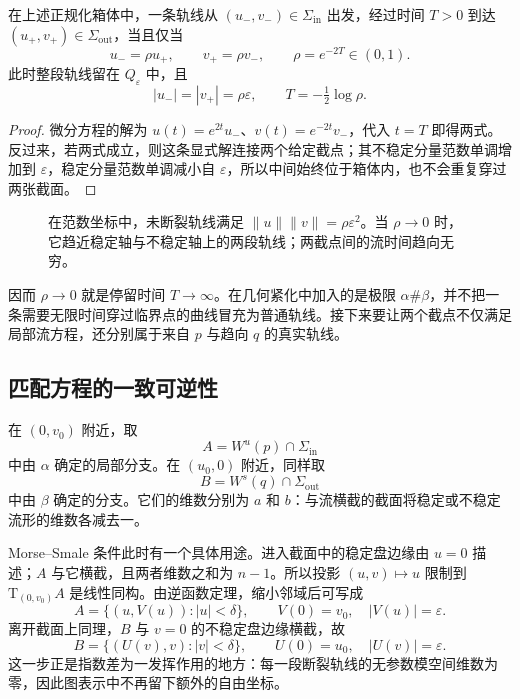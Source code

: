 \begin{lemma}\label{g2:lem:local-passage-equations}
	在上述正规化箱体中，一条轨线从 \((u_-,v_-)\in\Sigma_{\mathrm{in}}\) 出发，经过时间 \(T>0\) 到达 \((u_+,v_+)\in\Sigma_{\mathrm{out}}\)，当且仅当
	\begin{equation}\label{g2:eq:local-passage-matching}
		u_-=\rho u_+,\qquad v_+=\rho v_-,
		\qquad \rho=e^{-2T}\in(0,1).
	\end{equation}
	此时整段轨线留在 \(Q_\varepsilon\) 中，且
	\[
		|u_-|=|v_+|=\rho\varepsilon,\qquad
		T=-\tfrac12\log\rho.
	\]
\end{lemma}
\begin{proof}
	微分方程的解为 \(u(t)=e^{2t}u_-\)、\(v(t)=e^{-2t}v_-\)，代入 \(t=T\) 即得两式。反过来，若两式成立，则这条显式解连接两个给定截点；其不稳定分量范数单调增加到 \(\varepsilon\)，稳定分量范数单调减小自 \(\varepsilon\)，所以中间始终位于箱体内，也不会重复穿过两张截面。
\end{proof}

\begin{figure}[htbp]
	\centering
	
	\caption[正规化流的局部粘合]{在范数坐标中，未断裂轨线满足 \(\lVert u\rVert\lVert v\rVert=\rho\varepsilon^2\)。当 \(\rho\to0\) 时，它趋近稳定轴与不稳定轴上的两段轨线；两截点间的流时间趋向无穷。}
	\label{g2:fig:local-trajectory-gluing}
\end{figure}

因而 \(\rho\to0\) 就是停留时间 \(T\to\infty\)。在几何紧化中加入的是极限 \(\alpha\#\beta\)，并不把一条需要无限时间穿过临界点的曲线冒充为普通轨线。接下来要让两个截点不仅满足局部流方程，还分别属于来自 \(p\) 与趋向 \(q\) 的真实轨线。

\subsection{匹配方程的一致可逆性}
\label{g2:subsec:1803:02}

在 \((0,v_0)\) 附近，取
\[
	A=W^u(p)\cap\Sigma_{\mathrm{in}}
\]
中由 \(\alpha\) 确定的局部分支。在 \((u_0,0)\) 附近，同样取
\[
	B=W^s(q)\cap\Sigma_{\mathrm{out}}
\]
中由 \(\beta\) 确定的分支。它们的维数分别为 \(a\) 和 \(b\)：与流横截的截面将稳定或不稳定流形的维数各减去一。

\ProseParagraphBreak

Morse--Smale 条件此时有一个具体用途。进入截面中的稳定盘边缘由 \(u=0\) 描述；\(A\) 与它横截，且两者维数之和为 \(n-1\)。所以投影 \((u,v)\mapsto u\) 限制到 \(\mathrm T_{(0,v_0)}A\) 是线性同构。由逆函数定理，缩小邻域后可写成
\[
	A=\{(u,V(u)):|u|<\delta\},\qquad
	V(0)=v_0,\quad |V(u)|=\varepsilon.
\]
离开截面上同理，\(B\) 与 \(v=0\) 的不稳定盘边缘横截，故
\[
	B=\{(U(v),v):|v|<\delta\},\qquad
	U(0)=u_0,\quad |U(v)|=\varepsilon.
\]
这一步正是指数差为一发挥作用的地方：每一段断裂轨线的无参数模空间维数为零，因此图表示中不再留下额外的自由坐标。

